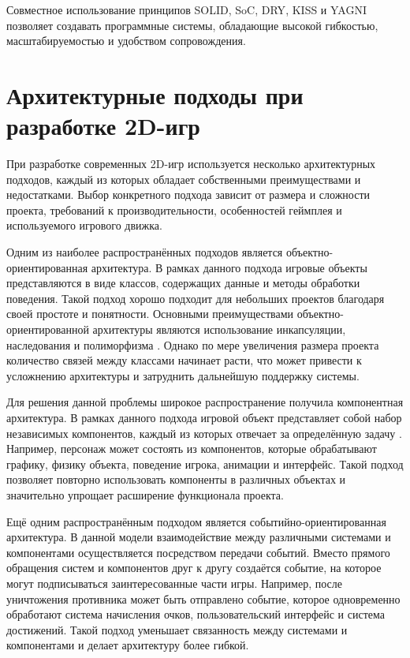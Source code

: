 \documentclass[a4paper,12pt]{report}
\begin{document}
Совместное использование принципов \acrshort{SOLID}, \acrshort{SoC}, \acrshort{DRY}, \acrshort{KISS} и \acrshort{YAGNI} позволяет создавать программные системы, обладающие высокой гибкостью, масштабируемостью и удобством сопровождения.

\section{Архитектурные подходы при разработке 2D-игр}

При разработке современных 2D-игр используется несколько архитектурных подходов, каждый из которых обладает собственными преимуществами и недостатками. Выбор конкретного подхода зависит от размера и сложности проекта, требований к производительности, особенностей геймплея и используемого игрового движка.

Одним из наиболее распространённых подходов является объектно-ориентированная архитектура. В рамках данного подхода игровые объекты представляются в виде классов, содержащих данные и методы обработки поведения. Такой подход хорошо подходит для небольших проектов благодаря своей простоте и понятности. Основными преимуществами объектно-ориентированной архитектуры являются использование инкапсуляции, наследования и полиморфизма \cite{vishwakarma2025}. Однако по мере увеличения размера проекта количество связей между классами начинает расти, что может привести к усложнению архитектуры и затруднить дальнейшую поддержку системы.

Для решения данной проблемы широкое распространение получила компонентная архитектура. В рамках данного подхода игровой объект представляет собой набор независимых компонентов, каждый из которых отвечает за определённую задачу \cite{weimann_inheritance}. Например, персонаж может состоять из компонентов, которые обрабатывают графику, физику объекта, поведение игрока, анимации и интерфейс. Такой подход позволяет повторно использовать компоненты в различных объектах и значительно упрощает расширение функционала проекта.

Ещё одним распространённым подходом является событийно-ориентированная архитектура. В данной модели взаимодействие между различными системами и компонентами осуществляется посредством передачи событий. Вместо прямого обращения систем и компонентов друг к другу создаётся событие, на которое могут подписываться заинтересованные части игры. Например, после уничтожения противника может быть отправлено событие, которое одновременно обработают система начисления очков, пользовательский интерфейс и система достижений. Такой подход уменьшает связанность между системами и компонентами и делает архитектуру более гибкой.
\end{document}
